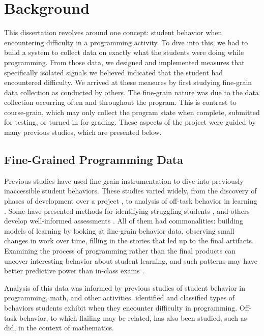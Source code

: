 \chapter{Background}
\label{chap:background}

This dissertation revolves around one concept: student behavior when encountering difficulty in a programming activity. To dive into this, we had to build a system to collect data on exactly what the students were doing while programming. From those data, we designed and implemented measures that specifically isolated signals we believed indicated that the student had encountered difficulty. We arrived at these measures by first studying fine-grain data collection as conducted by others. The fine-grain nature was due to the data collection occurring often and throughout the program. This is contrast to course-grain, which may only collect the program state when complete, submitted for testing, or turned in for grading. These aspects of the project were guided by many previous studies, which are presented below.

\section{Fine-Grained Programming Data}
Previous studies have used fine-grain instrumentation to dive into previously inaccessible student behaviors. These studies varied widely, from the discovery of phases of development over a project \citep{berland-2013, martin2013nanogenetic}, to analysis of off-task behavior in learning \citep{baker2004off}. Some have presented methods for identifying struggling students \cite{piech-2012}, and others develop well-informed assessments \citep{werner2012fairy}. All of them had commonalities: building models of learning by looking at fine-grain behavior data, observing small changes in work over time, filling in the stories that led up to the final artifacts. Examining the process of programming rather than the final products can uncover interesting behavior about student learning, and such patterns may have better predictive power than in-class exams \citep{blikstein2014}.

Analysis of this data was informed by previous studies of student behavior in programming, math, and other activities. \cite{perkins-1986} identified and classified types of behaviors students exhibit when they encounter difficulty in programming. Off-task behavior, to which flailing may be related, has also been studied, such as \cite{baker2004off} did, in the context of mathematics. 


